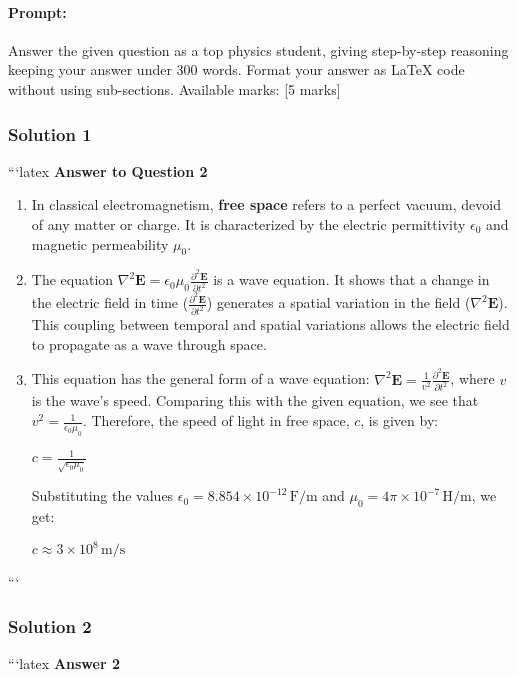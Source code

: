 \documentclass{article}
\begin{document}
\paragraph{Prompt: \\} 
Answer the given question as a top physics student, giving step-by-step reasoning keeping your answer under 300 words. Format your answer as LaTeX code without using sub-sections. Available marks: [5 marks]

\subsubsection{Solution 1}
```latex
\textbf{Answer to Question 2} 

\begin{enumerate}
\item In classical electromagnetism, \textbf{free space} refers to a perfect vacuum, devoid of any matter or charge. It is characterized by the electric permittivity $\epsilon_0$ and magnetic permeability $\mu_0$. 

\item The equation $\nabla^2 \mathbf{E} = \epsilon_0 \mu_0 \frac{\partial^2 \mathbf{E}}{\partial t^2}$ is a wave equation. It shows that a change in the electric field in time ($\frac{\partial^2 \mathbf{E}}{\partial t^2}$) generates a spatial variation in the field ($\nabla^2 \mathbf{E}$). This coupling between temporal and spatial variations allows the electric field to propagate as a wave through space.

\item  This equation has the general form of a wave equation: $\nabla^2 \mathbf{E} = \frac{1}{v^2} \frac{\partial^2 \mathbf{E}}{\partial t^2}$, where $v$ is the wave's speed.  Comparing this with the given equation, we see that $v^2 = \frac{1}{\epsilon_0 \mu_0}$.  Therefore, the speed of light in free space, $c$, is given by:

$c = \frac{1}{\sqrt{\epsilon_0 \mu_0}}$

Substituting the values $\epsilon_0 = 8.854 \times 10^{-12} \, \text{F/m}$ and $\mu_0 = 4\pi \times 10^{-7} \, \text{H/m}$, we get:

$c \approx 3 \times 10^8 \, \text{m/s}$ 
\end{enumerate}
```

\subsubsection{Solution 2}
```latex
\textbf{Answer 2}
\end{document}

